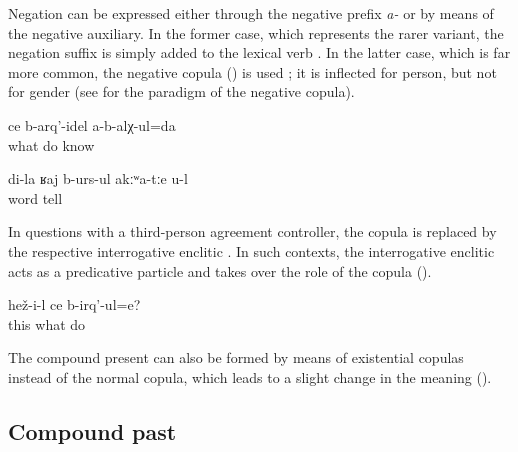Negation can be expressed either through the negative prefix \textit{a-} or by means of the negative auxiliary. In the former case, which represents the rarer variant, the negation suffix is simply added to the lexical verb . In the latter case, which is far more common, the negative copula   () is used ; it is inflected for person, but not for gender (see  for the paradigm of the negative copula).
%
\begin{exe}
	\ex	\label{ex:I do not know what to do analytic}
	\gll	ce	b-arq'-idel	a-b-alχ-ul=da\\
		what	do	know\\
	\glt	{}

	\ex	\label{ex:You tell only my words analytic}
	\gll	di-la	ʁaj	b-urs-ul	akːʷa-tːe	u-l\\
			word	tell		\\
	\glt	{}
\end{exe}

In questions with a third-person agreement controller, the copula is replaced by the respective interrogative enclitic . In such contexts, the interrogative enclitic acts as a predicative particle and takes over the role of the copula ().
%
\begin{exe}
	\ex	\label{ex:What is he doing analytic}
	\gll	hež-i-l	ce	b-irq'-ul=e?\\
		this	what	do\\
	\glt	{}
\end{exe}

The compound present can also be formed by means of existential copulas instead of the normal copula, which leads to a slight change in the meaning ().



\subsection{Compound past}
\label{ssec:Compound past}

